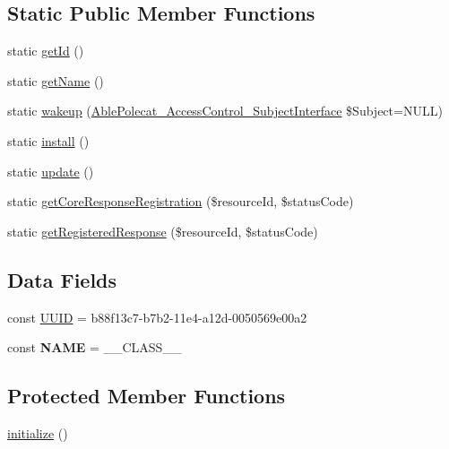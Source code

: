 \subsection*{Static Public Member Functions}
\begin{DoxyCompactItemize}
\item 
static \hyperlink{class_able_polecat___registry___response_acfaa3a96d0cb5a4c0d4d710dcba41e9e}{get\+Id} ()
\item 
static \hyperlink{class_able_polecat___registry___response_a4ef9bd37ba3ce8a13c1e8bcf4f72a630}{get\+Name} ()
\item 
static \hyperlink{class_able_polecat___registry___response_a3f2135f6ad45f51d075657f6d20db2cd}{wakeup} (\hyperlink{interface_able_polecat___access_control___subject_interface}{Able\+Polecat\+\_\+\+Access\+Control\+\_\+\+Subject\+Interface} \$Subject=N\+U\+L\+L)
\item 
static \hyperlink{class_able_polecat___registry___response_a7ee9452dbd39de4bfbe7a6dd9ed7bb65}{install} ()
\item 
static \hyperlink{class_able_polecat___registry___response_a00ce4d238d0651db584337f8e0b38c68}{update} ()
\item 
static \hyperlink{class_able_polecat___registry___response_a6b2ac4dc1e570f1e4eaf4fa65498e07e}{get\+Core\+Response\+Registration} (\$resource\+Id, \$status\+Code)
\item 
static \hyperlink{class_able_polecat___registry___response_a5cf62eaf5ec43ef07957ee021d2038a4}{get\+Registered\+Response} (\$resource\+Id, \$status\+Code)
\end{DoxyCompactItemize}
\subsection*{Data Fields}
\begin{DoxyCompactItemize}
\item 
const \hyperlink{class_able_polecat___registry___response_a74b892c8c0b86bf9d04c5819898c51e7}{U\+U\+I\+D} = \textquotesingle{}b88f13c7-\/b7b2-\/11e4-\/a12d-\/0050569e00a2\textquotesingle{}
\item 
\hypertarget{class_able_polecat___registry___response_a244352f035b82b20b0efa506167fd862}{}const {\bfseries N\+A\+M\+E} = \+\_\+\+\_\+\+C\+L\+A\+S\+S\+\_\+\+\_\+\label{class_able_polecat___registry___response_a244352f035b82b20b0efa506167fd862}

\end{DoxyCompactItemize}
\subsection*{Protected Member Functions}
\begin{DoxyCompactItemize}
\item 
\hyperlink{class_able_polecat___registry___response_a91098fa7d1917ce4833f284bbef12627}{initialize} ()
\end{DoxyCompactItemize}
